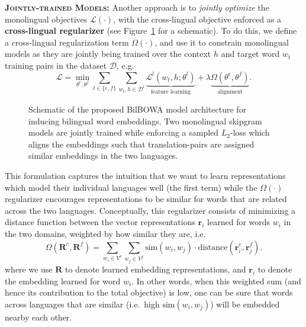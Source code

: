 \documentclass[10pt]{article}
\newcommand\bld[1]{\textbf{#1}}
\newcommand\mat[1]{\mathbf{#1}}
\newcommand\loss{\mathcal{L}}
\begin{document}
\textsc{\bld{Jointly-trained Models:}} Another approach is to \emph{jointly optimize}
the monolingual objectives $\loss(\cdot)$, with the cross-lingual objective
enforced as a \bld{cross-lingual regularizer} (see
Figure~\ref{fig:bilbowa-arch} for a schematic).  To do this, we define a
cross-lingual regularization term $\Omega(\cdot)$, and use it to constrain
monolingual models as they are jointly being trained over the context $h$
and target word $w_t$ training pairs in the dataset
$\mathcal{D}$, e.g.\: 
\begin{equation}
  \label{eqn:xling-general}
  \loss = \min_{\theta^e,\theta^f} \sum_{l \in \{e,f\}} \sum_{w_t,h \in \mathcal{D}^l} 
   \underbrace{\loss^l(w_t, h; \theta^l)}_\text{feature learning} + 
    \lambda \underbrace{\Omega(\theta^e, \theta^f)}_\text{alignment}.
\end{equation}

\begin{figure}
    \caption{Schematic of the proposed BilBOWA model architecture for inducing 
    bilingual word embeddings. Two monolingual skipgram models are jointly trained
    while enforcing a sampled $L_2$-loss which aligns the embeddings such that   
    translation-pairs are assigned similar embeddings in the two languages.}
\label{fig:bilbowa-arch}
\end{figure}
This formulation captures the intuition that we
want to learn representations which model their individual languages well (the
first term) while the $\Omega(\cdot)$ regularizer encourages representations to
be similar for words that are related across the two languages.  Conceptually,
this regularizer consists of minimizing a distance function between the
vector representations $\mat{r}_i$ learned for words $w_i$ in the two domains, weighted
by how similar they are, i.e.\ 
\begin{equation}
  \Omega(\mat{R}^e, \mat{R}^f) = 
  \sum_{w_i \in V^e} \sum_{w_j \in V^f} \textrm{sim}(w_i,w_j) 
     \cdot \text{distance}(\mat{r}^e_i, \mat{r}^f_j).
\end{equation}
where we use $\mat{R}$ to denote learned embedding representations, and $\mat{r}_i$ to denote
the embedding learned for word $w_i$. In other words, when this weighted sum (and
hence its contribution to the total objective) is low, one can be sure that
words across languages that are similar (i.e.\ high $\textrm{sim}(w_i, w_j)$) will
be embedded nearby each other. 
\end{document}

